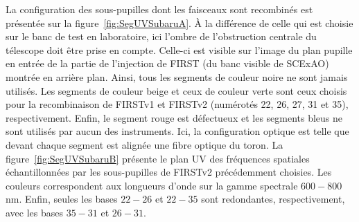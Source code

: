 La configuration des sous-pupilles dont les faisceaux sont recombinés est présentée sur la figure~\ref{fig:SegUVSubaruA}. À la différence de celle qui est choisie sur le banc de test en laboratoire, ici l'ombre de l'obstruction centrale du télescope doit être prise en compte. Celle-ci est visible sur l'image du plan pupille en entrée de la partie de l'injection de \ac{FIRST} (du banc visible de \ac{SCExAO}) montrée en arrière plan. Ainsi, tous les segments de couleur noire ne sont jamais utilisés. Les segments de couleur beige et ceux de couleur verte sont ceux choisis pour la recombinaison de \ac{FIRSTv1} et \ac{FIRSTv2} (numérotés 22, 26, 27, 31 et 35), respectivement. Enfin, le segment rouge est défectueux et les segments bleus ne sont utilisés par aucun des instruments. Ici, la configuration optique est telle que devant chaque segment est alignée une fibre optique du toron. La figure~\ref{fig:SegUVSubaruB} présente le plan UV des fréquences spatiales échantillonnées par les sous-pupilles de \ac{FIRSTv2} précédemment choisies. Les couleurs correspondent aux longueurs d'onde sur la gamme spectrale $600 - 800 \,$nm. Enfin, seules les bases $22 - 26$ et $22 - 35$ sont redondantes, respectivement, avec les bases $35 - 31$ et $26 - 31$.

